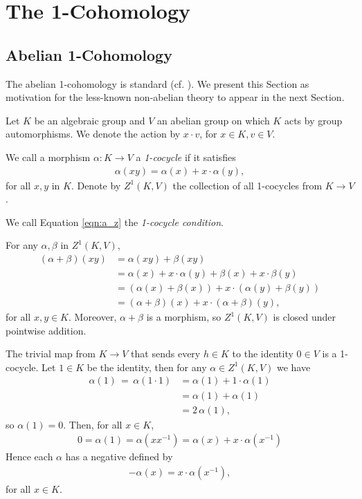 
\chapter{The 1-Cohomology}
\label{Chapter3}

\section{Abelian 1-Cohomology}
The abelian 1-cohomology is standard (cf. \cite{brown1976cohomology}). We present this Section as motivation for the less-known non-abelian theory to appear in the next Section.

Let $K$ be an algebraic group and $V$ an abelian group on which $K$ acts by group automorphisms. We denote the action by $x \cdot v$, for $x \in K, v \in V$.

\begin{definition} We call a morphism $\alpha: K\rightarrow V$ a \emph{1-cocycle} if it satisfies
	\begin{align}
		\alpha(xy) = \alpha(x) + x\cdot\alpha(y),
		\label{eqn:a_z}
	\end{align}
	for all $x, y$ in $K$. Denote by $Z^1\left( K, V \right)$ the collection of all 1-cocycles from $K\rightarrow V$.

	We call Equation \ref{eqn:a_z} the \emph{1-cocycle condition}.
\end{definition}

For any $\alpha, \beta$ in $Z^1\left(K, V\right)$,
\begin{align*}
	\left(\alpha + \beta\right)(xy) &=  \alpha(xy) +  \beta(xy) \\
	&=  \alpha(x) + x\cdot\alpha(y) +  \beta(x) + x\cdot\beta(y)\\
	&=  \left( \alpha(x) + \beta(x) \right) + x\cdot\left(\alpha(y) + \beta(y)\right) \\
	&=  \left(\alpha+\beta\right)(x) + x\cdot\left(\alpha + \beta\right)(y),
\end{align*}
for all $x,y \in K$. Moreover, $\alpha + \beta$ is a morphism, so $Z^1(K, V)$ is closed under pointwise addition.

The trivial map from $K \rightarrow V$ that sends every $h \in K$ to the identity $0 \in V$ is a 1-cocycle. Let $1\in K$ be the identity, then for any $\alpha \in Z^1(K, V)$ we have
\begin{align*}
	\alpha(1)\, =\, \alpha(1\cdot 1) &=  \alpha(1) + 1\cdot \alpha(1) \\
	&=  \alpha(1) + \alpha(1) \\
	&=  2\,\alpha(1),
\end{align*}
so $\alpha(1) = 0$. Then, for all $x \in K$,
\begin{align*}
	0 = \alpha(1) = \alpha(xx^{-1}) = \alpha(x) + x \cdot \alpha(x^{-1})
\end{align*}
Hence each $\alpha$ has a negative defined by
\begin{align*}
	-\alpha(x) = x\cdot\alpha(x^{-1}),
\end{align*}
for all $x \in K$. 

